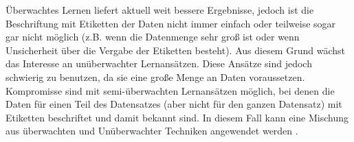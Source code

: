 Überwachtes Lernen liefert aktuell weit bessere Ergebnisse, jedoch ist die Beschriftung mit Etiketten der Daten nicht immer einfach oder teilweise sogar gar nicht möglich (z.B. wenn die Datenmenge sehr groß ist oder wenn Unsicherheit über die Vergabe der Etiketten besteht).
Aus diesem Grund wächst das Interesse an unüberwachter Lernansätzen.
Diese Ansätze sind jedoch schwierig zu benutzen, da sie eine große Menge an Daten voraussetzen.
Kompromisse sind mit semi-überwachten Lernansätzen möglich, bei denen die Daten für einen Teil des Datensatzes (aber nicht für den ganzen Datensatz) mit Etiketten beschriftet und damit bekannt sind.
In diesem Fall kann eine Mischung aus überwachten und Unüberwachter Techniken angewendet werden \cite{Zhu2008}.